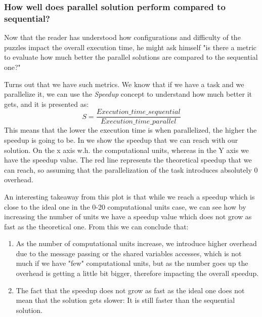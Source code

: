 \subsubsection{How well does parallel solution perform compared to sequential?}
\label{subsubsec:speedup_efficiency}

Now that the reader has understood how configurations and difficulty of the puzzles impact the overall execution time, he might ask himself "is there a metric to evaluate how much better the parallel solutions are compared to the sequential one?"

Turns out that we have such metrics. We know that if we have a task and we parallelize it, we can use the \textit{Speedup} concept to understand how much better it gets, and it is presented as:
\[
S = \frac{Execution\_time\_sequential}{Execution\_time\_parallel}
\]
This means that the lower the execution time is when parallelized, the higher the speedup is going to be. In  we show the speedup that we can reach with our solution. On the x axis w.h. the computational units, whereas in the Y axis we have the speedup value. The red line represents the theoretical speedup that we can reach, so assuming that the parallelization of the task introduces absolutely 0 overhead.

An interesting takeaway from this plot is that while we reach a speedup which is close to the ideal one in the 0-20 computational units case, we can see how by increasing the number of units we have a speedup value which does not grow as fast as the theoretical one. From this we can conclude that:
\begin{enumerate}
    \item As the number of computational units increase, we introduce higher overhead due to the message passing or the shared variables accesses, which is not much if we have "few" computational units, but as the number goes up the overhead is getting a little bit bigger, therefore impacting the overall speedup.
    \item The fact that the speedup does not grow as fast as the ideal one does not mean that the solution gets slower: It is still faster than the sequential solution.
\end{enumerate}


